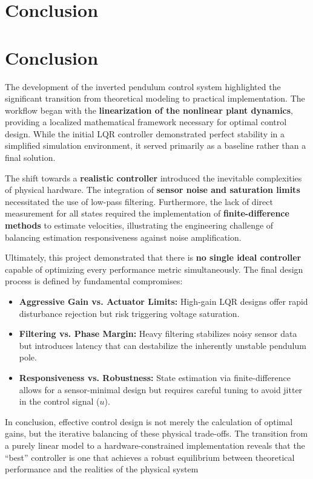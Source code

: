\documentclass[a4paper,10pt]{article}
\theoremstyle{bluehomework}
\numberwithin{equation}{section}
\begin{document}
\FloatBarrier

\section{Conclusion}

\section*{Conclusion}

The development of the inverted pendulum control system highlighted the significant transition from theoretical modeling to practical implementation. The workflow began with the \textbf{linearization of the nonlinear plant dynamics}, providing a localized mathematical framework necessary for optimal control design. While the initial LQR controller demonstrated perfect stability in a simplified simulation environment, it served primarily as a baseline rather than a final solution.

The shift towards a \textbf{realistic controller} introduced the inevitable complexities of physical hardware. The integration of \textbf{sensor noise and saturation limits} necessitated the use of low-pass filtering. Furthermore, the lack of direct measurement for all states required the implementation of \textbf{finite-difference methods} to estimate velocities, illustrating the engineering challenge of balancing estimation responsiveness against noise amplification.

Ultimately, this project demonstrated that there is \textbf{no single ideal controller} capable of optimizing every performance metric simultaneously. The final design process is defined by fundamental compromises:

\begin{itemize}
    \item \textbf{Aggressive Gain vs. Actuator Limits:} High-gain LQR designs offer rapid disturbance rejection but risk triggering voltage saturation.
    \item \textbf{Filtering vs. Phase Margin:} Heavy filtering stabilizes noisy sensor data but introduces latency that can destabilize the inherently unstable pendulum pole.
    \item \textbf{Responsiveness vs. Robustness:} State estimation via finite-difference allows for a sensor-minimal design but requires careful tuning to avoid jitter in the control signal ($u$).
\end{itemize}

In conclusion, effective control design is not merely the calculation of optimal gains, but the iterative balancing of these physical trade-offs. The transition from a purely linear model to a hardware-constrained implementation reveals that the ``best'' controller is one that achieves a robust equilibrium between theoretical performance and the realities of the physical system
\end{document}
